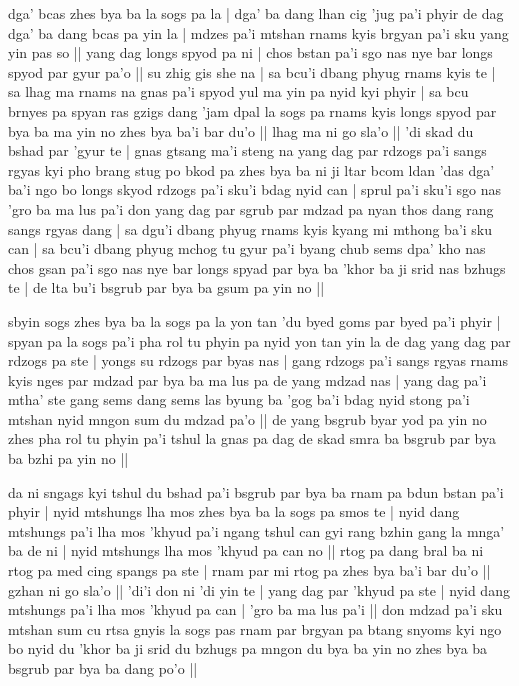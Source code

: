 \documentclass[11pt,twoside]{article}\makeatletter
\begin{document}
\label{TV6}dga' bcas zhes bya ba la sogs pa la | dga' ba dang lhan cig 'jug pa'i phyir de dag dga' ba dang bcas pa yin la | mdzes pa'i mtshan rnams kyis brgyan pa'i sku yang yin pas so || yang dag longs spyod pa  ni | chos bstan pa'i sgo nas nye bar longs spyod par gyur pa'o || su zhig gis she na | sa bcu'i dbang phyug rnams kyis te | sa lhag ma rnams na gnas pa'i spyod yul ma yin pa nyid kyi phyir | sa bcu brnyes pa spyan ras gzigs dang 'jam dpal la sogs pa rnams kyis longs spyod par bya ba ma yin no zhes bya ba'i bar du'o || lhag ma ni go sla'o || 'di skad du bshad par 'gyur te | gnas gtsang ma'i steng na yang dag par rdzogs pa'i sangs rgyas kyi pho brang stug po bkod pa zhes bya ba ni ji ltar bcom ldan 'das dga' ba'i ngo bo longs skyod rdzogs pa'i sku'i bdag nyid can | sprul pa'i sku'i sgo nas 'gro ba ma lus pa'i don yang dag par sgrub par mdzad pa nyan thos dang rang sangs rgyas dang | sa dgu'i dbang phyug rnams kyis kyang mi mthong ba'i sku can | sa bcu'i dbang phyug mchog tu gyur pa'i byang chub sems dpa' kho nas chos gsan pa'i sgo nas nye bar longs spyad par bya ba 'khor ba ji srid nas bzhugs te | de lta bu'i bsgrub par bya ba gsum pa yin no ||
\par
\label{TV7}sbyin sogs zhes bya ba la sogs pa la yon tan 'du byed goms par byed pa'i phyir | spyan pa la sogs pa'i pha rol tu phyin pa nyid yon tan yin la de dag yang dag par rdzogs pa ste | yongs su rdzogs par byas nas | gang rdzogs pa'i sangs rgyas rnams kyis nges par mdzad par bya ba ma lus pa de yang mdzad nas | yang dag pa'i mtha' ste gang sems dang sems las byung ba 'gog ba'i bdag nyid stong pa'i mtshan nyid mngon sum du mdzad pa'o || de yang bsgrub byar yod pa yin no zhes pha rol tu phyin pa'i tshul la gnas pa dag de skad smra ba bsgrub par bya ba bzhi pa yin no || 
\par
\label{TV8}da ni sngags kyi tshul du bshad pa'i bsgrub par bya ba rnam pa bdun bstan pa'i phyir | nyid mtshungs lha mos zhes bya ba la sogs pa smos te | nyid dang mtshungs pa'i lha mos 'khyud pa'i ngang tshul can gyi rang bzhin gang la mnga' ba de ni | nyid mtshungs lha mos 'khyud pa can no || rtog pa dang bral ba ni rtog pa med cing spangs pa ste | rnam par mi rtog pa zhes bya ba'i bar du'o || gzhan ni go sla'o || 'di'i don ni 'di yin te | yang dag par 'khyud pa ste | nyid dang mtshungs pa'i lha mos 'khyud pa can | 'gro ba ma lus pa'i  || don mdzad pa'i sku mtshan sum cu rtsa gnyis la sogs pas rnam par brgyan pa btang snyoms kyi ngo bo nyid du 'khor ba ji srid du bzhugs pa mngon du bya ba yin no zhes bya ba bsgrub par bya ba dang po'o ||
\end{document}

